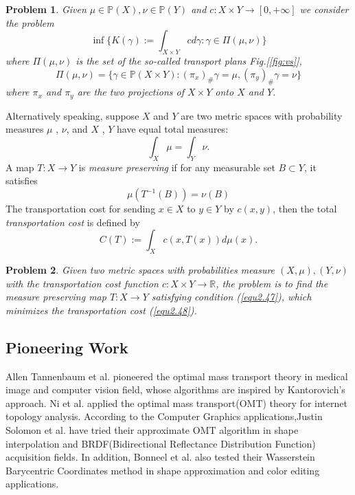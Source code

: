\documentclass[runningheads]{llncs}
\newtheorem{mypro}{Problem}
\begin{document}
\begin{mypro}
Given $\mu \in \mathbb{P}(X), \nu \in \mathbb{P}(Y)$ and $c:X\times Y \rightarrow [0,+\infty]$ we consider the problem $$\inf \{K(\gamma):=\int_{X\times Y}c   d\gamma: \gamma \in \Pi(\mu, \nu) \}$$
where $\Pi(\mu, \nu)$ is the set of the so-called transport plans Fig.[\ref{fig:vs}], $$\Pi(\mu,\nu) = \{\gamma \in \mathbb{P}(X\times Y):(\pi_x)_{\#}\gamma = \mu, (\pi_y)_{\#}\gamma = \nu\}$$
where $\pi_x$ and $\pi_y$ are the two projections of $X\times Y$ onto $X$ and $Y$.
\end{mypro}


Alternatively speaking, suppose $X$ and $Y$ are two metric spaces with probability measures $\mu$ , $\nu$, and $X$ , $Y$ have equal total measures:$$\int_X\mu = \int_Y\nu.$$
A map $T:X\rightarrow Y$ is \textit{measure preserving} if for any measurable set $B\subset Y$, it satisfies
\begin{equation}\label{equ2.47}
\mu(T^{-1}(B)) = \nu(B)
\end{equation}
The transportation cost for sending $x\in X$ to $y\in Y$ by $c(x,y)$, then the total \textit{transportation cost} is defined by
\begin{equation}\label{equ2.48}
C(T):=\int_X c(x,T(x))d\mu(x).
\end{equation}

\begin{mypro}
Given two metric spaces with probabilities measure $(X,\mu), (Y,\nu)$ with the transportation cost function $c:X\times Y\rightarrow \mathbb{R}$, the problem is to find the measure preserving map $T:X\rightarrow Y$ satisfying condition (\ref{equ2.47}), which minimizes the transportation cost (\ref{equ2.48}).
\end{mypro}





\subsection{Pioneering Work}

Allen Tannenbaum\cite{haker2004optimal,ur20093d,dominitz2010texture} et al. pioneered the optimal mass transport theory in medical image and computer vision field, whose algorithms are inspired by Kantorovich's approach. Ni\cite{ni2015ricci} et al. applied the optimal mass transport(OMT) theory for internet topology analysis. According to the Computer Graphics applications,Justin Solomon\cite{solomon2015convolutional} et al. have tried their approximate OMT algorithm in shape interpolation and BRDF(Bidirectional Reflectance Distribution Function) acquisition fields. In addition, Bonneel\cite{bonneel2016wasserstein} et al. also tested their Wasserstein Barycentric Coordinates method in shape approximation and color editing applications.
\end{document}
